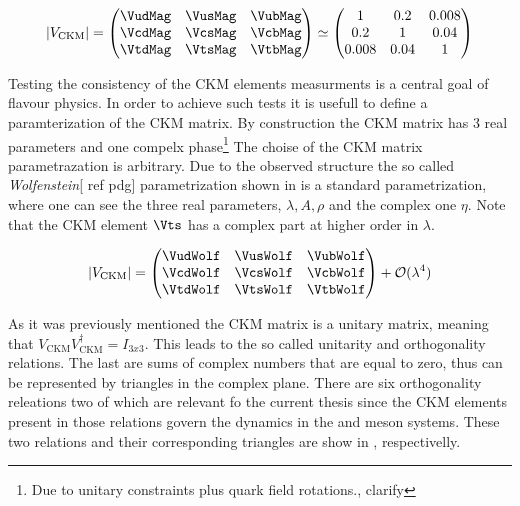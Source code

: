 \begin{equation}
  |V_{\text{CKM}}|
                   = \begin{pmatrix} \VudMag & \VusMag & \VubMag \\ \VcdMag & \VcsMag & \VcbMag \\ \VtdMag & \VtsMag & \VtbMag \end{pmatrix}
              \simeq \begin{pmatrix} 1 & 0.2 & 0.008 \\ 0.2 & 1 & 0.04 \\ 0.008 & 0.04 & 1 \end{pmatrix}
      \label{CKMmatrix}
  \end{equation}

Testing the consistency of the CKM elements measurments is a central goal of flavour physics.
In order to achieve such tests it is usefull to define a paramterization of the CKM matrix.
By construction the CKM matrix has 3 real parameters and one compelx phase\footnote{Due to unitary constraints plus quark field rotations.,{\color{red} clarify}}
The choise of the CKM matrix parametrazation is arbitrary. Due to the observed structure the so called {\it Wolfenstein}[{\color{red} ref pdg}]
parametrization shown in  is a standard parametrization, where one can see the three real parameters, $\lambda,A,\rho$
and the complex one $\eta$. Note that the CKM element $\Vts$ has a complex part at higher order in $\lambda$.

\begin{equation}
  |V_{\text{CKM}}|
                   = \begin{pmatrix} \VudWolf & \VusWolf & \VubWolf \\
                                     \VcdWolf & \VcsWolf & \VcbWolf \\
                                     \VtdWolf & \VtsWolf & \VtbWolf \end{pmatrix} + \mathcal{O}(\lambda^4)
      \label{CKMwolfenstein}
\end{equation}

\noindent As it was previously mentioned the CKM matrix is a unitary matrix, meaning that $V_{\text{CKM}} V_{\text{CKM}}^\dagger = I_{3x3}$.
This leads to the so called unitarity and orthogonality relations. The last are sums of complex numbers that are equal to zero, thus can be
represented by triangles in the complex plane. There are six orthogonality releations two of which are relevant fo the current thesis since
the CKM elements present in those relations govern the dynamics in the \Bs and \Bd meson systems. These two relations and their corresponding
triangles are show in ,  respectivelly.

